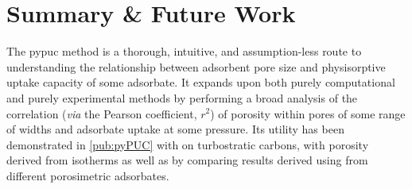\setcounter{opagenum}{\thepage}

\newpage

\setlength{\originalVOffset}{\voffset}   
\setlength{\originalHOffset}{\hoffset}

\setlength{\voffset}{0cm}
\setlength{\hoffset}{0cm}

\setlength{\voffset}{\originalVOffset}
\setlength{\hoffset}{\originalHOffset}




\section{Summary \& Future Work}
The \acrshort{pypuc} method is a thorough, intuitive, and assumption-less route to understanding the relationship between \gls{adsorbent} pore size and physisorptive uptake capacity of some \gls{adsorbate}. It expands upon both purely computational and purely experimental methods by performing a broad analysis of the correlation (\textit{via} the Pearson coefficient, $r^2$) of porosity within pores of some range of widths and \gls{adsorbate} uptake at some pressure. Its utility has been demonstrated in \ref{pub:pyPUC} with  on \glspl{turbostratic carbon}, with porosity derived from  isotherms as well as by comparing results derived using  from different porosimetric \glspl{adsorbate}.

